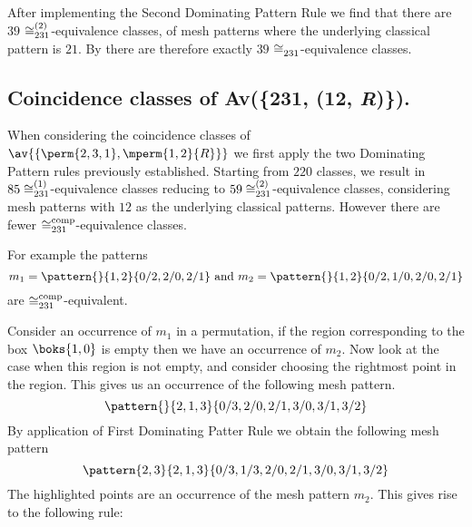 After implementing the Second Dominating Pattern Rule we find that there are
\(39\) \(\coinc[(2)]{231}\)-equivalence classes, of mesh patterns where the underlying
classical pattern is \(21\). By  there are
therefore exactly \(39\) \(\coinc{231}\)-equivalence classes.

\subsection{Coincidence classes of Av(\{231, (12, \textit{R})\}).}
When considering the coincidence classes of \(\av{\{\perm{2,3,1},\mperm{1,2}{R}\}}\)
we first apply the two Dominating Pattern rules previously established.
Starting from \(220\) classes, we result in \(85 \coinc[(1)]{231}\)-equivalence classes
reducing to \(59 \coinc[(2)]{231}\)-equivalence classes, considering mesh patterns with
\(12\) as the underlying classical patterns. However there are fewer \(\coinc[comp]{231}\)-equivalence classes.

For example the patterns
\begin{equation*}
    m_1 = \pattern{}{1,2}{0/2,2/0,2/1} \text{ and } m_2 = \pattern{}{1,2}{0/2,1/0,2/0,2/1}
\end{equation*}
are \(\coinc[comp]{231}\)-equivalent.

Consider an occurrence of \(m_1\) in a permutation, if the region corresponding
to the box \(\boks{1,0}\) is empty then we have an occurrence of \(m_2\). Now look at
the case when this region is not empty, and consider choosing the rightmost
point in the region.
This gives us an occurrence of the following mesh pattern.
\begin{equation*}
    \pattern{}{2,1,3}{0/3,2/0,2/1,3/0,3/1,3/2}
\end{equation*}
By application of First Dominating Patter Rule we obtain the following
mesh pattern
\begin{equation*}
    \pattern{2,3}{2,1,3}{0/3,1/3,2/0,2/1,3/0,3/1,3/2}
\end{equation*}
The highlighted points are an occurrence
of the mesh pattern \(m_2\). This gives rise to the following
rule:

